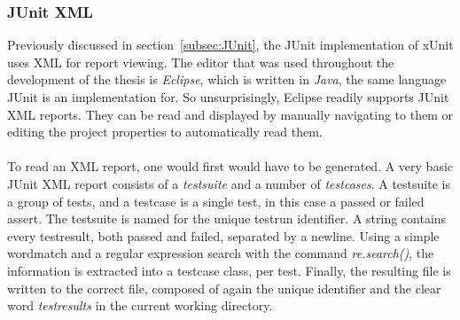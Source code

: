 \documentclass[11pt,british]{article}
\begin{document}
\subsubsection{JUnit XML}
Previously discussed in section~\ref{subsec:JUnit}, the JUnit implementation of xUnit uses \gls{XML} for report viewing. The editor that was used throughout the development of the thesis is \emph{Eclipse}, which is written in \emph{Java}, the same language JUnit is an implementation for. So unsurprisingly, Eclipse readily supports JUnit XML reports. They can be read and displayed by manually navigating to them or editing the project properties to automatically read them.\\
\\
To read an XML report, one would first would have to be generated. A very basic JUnit XML report consists of a \emph{testsuite} and a number of \emph{testcases}. A testsuite is a group of tests, and a testcase is a single test, in this case a passed or failed assert.
The testsuite is named for the unique testrun identifier. A string contains every testresult, both passed and failed, separated by a newline. Using a simple wordmatch and a regular expression search with the command \emph{re.search()}, the information is extracted into a testcase class, per test. Finally, the resulting file is written to the  correct file, composed of again the unique identifier and the clear word \emph{testresults} in the current working directory.\\
\end{document}
